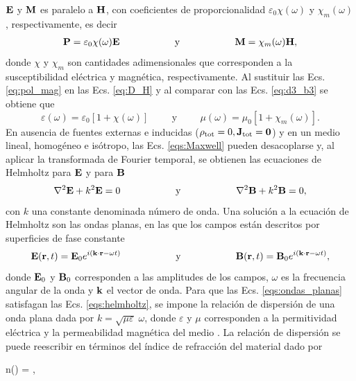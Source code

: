  $\vb{E}$ y $\vb{M}$ es paralelo a $\vb{H}$, con coeficientes de proporcionalidad $\varepsilon_0 \chi(\omega)$ y $\chi_m(\omega)$, respectivamente, es decir \cite{griffithsIntroductionElectrodynamics2023}
\begin{align}
	\vb{P}=\varepsilon_0\chi(\omega)\vb{E}\hspace{2cm}\text{y}\hspace{2cm}
	\vb{M}=\chi_m(\omega)\vb{H},
	\label{eq:pol_mag}
\end{align}
%
donde $\chi$ y $\chi_m$ son cantidades adimensionales que corresponden a la susceptibilidad eléctrica y magnética, respectivamente. Al sustituir las Ecs. \eqref{eq:pol_mag} en las Ecs. \eqref{eq:D_H} y al comparar con las Ecs. \eqref{eq:d3_b3} se obtiene que
%
\begin{equation}
	\varepsilon(\omega)=\varepsilon_0[1+\chi(\omega)]\hspace{1cm}\text{y}\hspace{1cm}	\mu(\omega)=\mu_0[1+\chi_m(\omega)].
\end{equation}
%
En ausencia de fuentes externas e inducidas ($ \rho_{\text{tot}} = 0, \vb{J}_{\text{tot}} = \vb{0}$) y en un medio lineal, homogéneo e isótropo, las Ecs. \eqref{eqs:Maxwell} pueden desacoplarse y, al aplicar la transformada de Fourier temporal, se obtienen las ecuaciones de Helmholtz para $\vb{E}$ y para $\vb{B}$ \cite{jacksonClassicalElectrodynamics2021}
%
\begin{equation}
	\laplacian{\vb{E}}+k^2\vb{E}=0\hspace{2cm}\text{y}\hspace{2cm} \laplacian{\vb{B}}+k^2\vb{B}=0,
	\label{eqs:helmholtz}
\end{equation}
%
con $k$ una constante denominada número de onda. Una solución a la ecuación de Helmholtz son las ondas planas, en las que los campos están descritos por superficies de fase constante \cite{griffithsIntroductionElectrodynamics2023}
%
\begin{equation}
	\vb{E}(\vb{r},t) =\vb{E}_0 e^{i(\vb{k}\cdot\vb{r} -\omega t)}\hspace{2cm}\text{y}\hspace{2cm} \vb{B}(\vb{r}, t) =\vb{B}_0 e^{i(\vb{k}\cdot\vb{r} -\omega t)},	
	\label{eqs:ondas_planas}
\end{equation}
%
\noindent donde $\vb{E}_0$ y $\vb{B}_0$ corresponden a las amplitudes de los campos, $\omega$ es la frecuencia angular de la onda y $\vb{k}$ el vector de onda. Para que las Ecs. \eqref{eqs:ondas_planas} satisfagan las Ecs. \eqref{eqs:helmholtz}, se impone la relación de dispersión de una onda plana dada por $k=\sqrt{\mu\varepsilon}\;\omega$, donde $\varepsilon$ y $\mu$ corresponden a la permitividad eléctrica y la permeabilidad magnética del medio \cite{jacksonClassicalElectrodynamics2021}. La relación de dispersión se puede reescribir en términos del índice de refracción del material dado por \cite{jacksonClassicalElectrodynamics2021}
\vspace{-0.1cm}
%
\begin{tcolorbox}
	n(\omega) = ,
	\label{eq:indice} 
\end{tcolorbox}
%	

